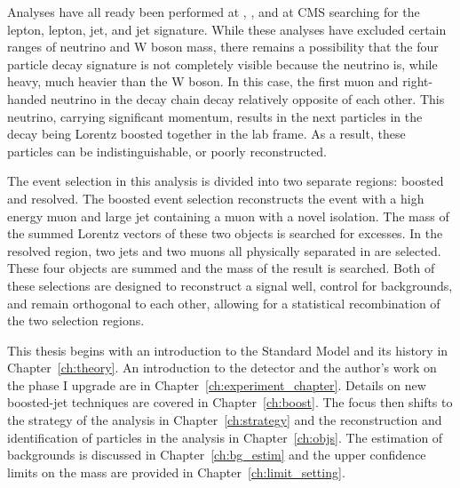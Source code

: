 Analyses have all ready been performed at \rootsseven, \rootseight, and \rootsthirteen \cite{chatrchyan2012a}\cite{osti_1156534}\cite{EXO-17-011} at CMS searching for the lepton, lepton, jet, and jet signature.  While these analyses have excluded certain ranges of neutrino and W boson mass, there remains a possibility that the four particle decay signature is not completely visible because the neutrino is, while heavy, much heavier than the W boson.  In this case, the first muon and right-handed neutrino in the decay chain decay relatively opposite of each other.  This neutrino, carrying significant momentum, results in the next particles in the decay being Lorentz boosted together in the lab frame.  As a result, these particles can be indistinguishable, or poorly reconstructed.

The event selection in this analysis is divided into two separate regions: boosted and resolved. The boosted event selection reconstructs the event with a high energy muon and large jet containing a muon with a novel isolation.  The mass of the summed Lorentz vectors of these two objects is searched for excesses. In the resolved region, two jets and two muons all physically separated in \deltaR are selected.  These four objects are summed and the mass of the result is searched. Both of these selections are designed to reconstruct a signal well, control for backgrounds, and remain orthogonal to each other, allowing for a statistical recombination of the two selection regions. 

This thesis begins with an introduction to the Standard Model and its history in Chapter~\ref{ch:theory}. An introduction to the \CMS detector and the author's work on the \HCAL phase I upgrade are in Chapter~\ref{ch:experiment_chapter}. Details on new boosted-jet techniques are covered in Chapter~\ref{ch:boost}. The focus then shifts to the strategy of the analysis in Chapter~\ref{ch:strategy} and the reconstruction and identification of particles in the analysis in Chapter~\ref{ch:objs}. The estimation of backgrounds is discussed in Chapter~\ref{ch:bg_estim} and the upper confidence limits on the \WR mass are provided in Chapter~\ref{ch:limit_setting}.






